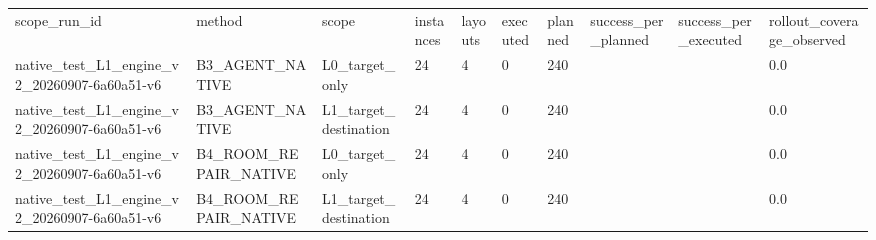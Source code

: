 \begin{tabular}{llllllllll}
scope\_run\_id & method & scope & instances & layouts & executed & planned & success\_per\_planned & success\_per\_executed & rollout\_coverage\_observed \\
native\_test\_L1\_engine\_v2\_20260907-6a60a51-v6 & B3\_AGENT\_NATIVE & L0\_target\_only & 24 & 4 & 0 & 240 &  &  & 0.0 \\
native\_test\_L1\_engine\_v2\_20260907-6a60a51-v6 & B3\_AGENT\_NATIVE & L1\_target\_destination & 24 & 4 & 0 & 240 &  &  & 0.0 \\
native\_test\_L1\_engine\_v2\_20260907-6a60a51-v6 & B4\_ROOM\_REPAIR\_NATIVE & L0\_target\_only & 24 & 4 & 0 & 240 &  &  & 0.0 \\
native\_test\_L1\_engine\_v2\_20260907-6a60a51-v6 & B4\_ROOM\_REPAIR\_NATIVE & L1\_target\_destination & 24 & 4 & 0 & 240 &  &  & 0.0 \\
\end{tabular}
